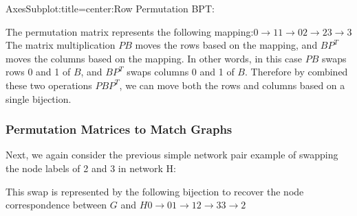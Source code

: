 \documentclass[letterpaper,10pt,english]{jupyterBook}
\begin{document}
\begin{sphinxVerbatim}[commandchars=\\\{\}]
\PYGZlt{}AxesSubplot:title=\PYGZob{}\PYGZsq{}center\PYGZsq{}:\PYGZsq{}Row Permutation \PYGZdl{}BP\PYGZca{}T\PYGZdl{}:\PYGZsq{}\PYGZcb{}\PYGZgt{}
\end{sphinxVerbatim}

\noindent{}

\sphinxAtStartPar
The permutation matrix represents the following mapping:\(0 \rightarrow 1\)\(1 \rightarrow 0\)\(2 \rightarrow 2\)\(3 \rightarrow 3\)The matrix multiplication \(PB\) moves the rows based on the mapping, and \(BP^T\) moves the columns based on the mapping. In other words, in this case \(PB\) swaps rows 0 and 1 of \(B\), and \(BP^T\) swaps columns 0 and 1 of \(B\). Therefore by combined these two operations \(PBP^T\), we can move both the rows and columns based on a single bijection.


\subsubsection{Permutation Matrices to Match Graphs}
\label{\detokenize{applications/ch9/graph-matching-vertex:permutation-matrices-to-match-graphs}}
\sphinxAtStartPar
Next, we again consider the previous simple network pair example of swapping the node labels of 2 and 3 in network H:



\sphinxAtStartPar
This swap is represented by the following bijection to recover the node correspondence between \(G\) and \(H\)\(0 \rightarrow 0\)\(1 \rightarrow 1\)\(2 \rightarrow 3\)\(3 \rightarrow 2\)
\end{document}
